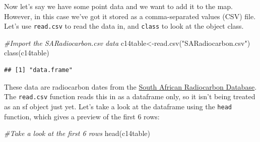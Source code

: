 \documentclass[
]{book}
\newenvironment{Shaded}{\begin{snugshade}}{\end{snugshade}}
\newcommand{\CommentTok}[1]{\textcolor[rgb]{0.56,0.35,0.01}{\textit{#1}}}
\newcommand{\FunctionTok}[1]{\textcolor[rgb]{0.00,0.00,0.00}{#1}}
\newcommand{\NormalTok}[1]{#1}
\newcommand{\OtherTok}[1]{\textcolor[rgb]{0.56,0.35,0.01}{#1}}
\newcommand{\StringTok}[1]{\textcolor[rgb]{0.31,0.60,0.02}{#1}}
\begin{document}
Now let's say we have some point data and we want to add it to the map. However, in this case we've got it stored as a comma-separated values (CSV) file. Let's use \texttt{read.csv} to read the data in, and \texttt{class} to look at the object class.

\begin{Shaded}
\begin{Highlighting}[]
\CommentTok{\#Import the SARadiocarbon.csv data}
\NormalTok{c14table}\OtherTok{\textless{}{-}}\FunctionTok{read.csv}\NormalTok{(}\StringTok{"SARadiocarbon.csv"}\NormalTok{)}
\FunctionTok{class}\NormalTok{(c14table)}
\end{Highlighting}
\end{Shaded}

\begin{verbatim}
## [1] "data.frame"
\end{verbatim}

These data are radiocarbon dates from the \href{https://www.cambridge.org/core/journals/antiquity/article/abs/an-archaeological-radiocarbon-database-for-southern-africa/26FE99E995C4507015704D552CB0C196}{South African Radiocarbon Database}. The \texttt{read.csv} function reads this in as a dataframe only, so it isn't being treated as an sf object just yet. Let's take a look at the dataframe using the \texttt{head} function, which gives a preview of the first 6 rows:

\begin{Shaded}
\begin{Highlighting}[]
\CommentTok{\#Take a look at the first 6 rows}
\FunctionTok{head}\NormalTok{(c14table)}
\end{Highlighting}
\end{Shaded}
\end{document}
